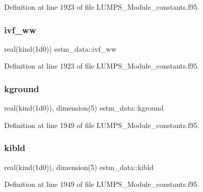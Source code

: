 Definition at line 1923 of file L\+U\+M\+P\+S\+\_\+\+Module\+\_\+constants.\+f95.

\mbox{\label{namespaceestm__data_aae1ab3ae31af3a3a39bfc76c3ba8a3f1}} 
\subsubsection{\texorpdfstring{ivf\+\_\+ww}{ivf\_ww}}
{\footnotesize\ttfamily real(kind(1d0)) estm\+\_\+data\+::ivf\+\_\+ww}



Definition at line 1923 of file L\+U\+M\+P\+S\+\_\+\+Module\+\_\+constants.\+f95.

\mbox{\label{namespaceestm__data_a4bc69fd9c3630659ed7aa78ab5218b3e}} 
\subsubsection{\texorpdfstring{kground}{kground}}
{\footnotesize\ttfamily real(kind(1d0)), dimension(5) estm\+\_\+data\+::kground}



Definition at line 1949 of file L\+U\+M\+P\+S\+\_\+\+Module\+\_\+constants.\+f95.

\mbox{\label{namespaceestm__data_ad62e9580ef44ce102500c1a5db394ca4}} 
\subsubsection{\texorpdfstring{kibld}{kibld}}
{\footnotesize\ttfamily real(kind(1d0)), dimension(5) estm\+\_\+data\+::kibld}



Definition at line 1949 of file L\+U\+M\+P\+S\+\_\+\+Module\+\_\+constants.\+f95.

\mbox{\label{namespaceestm__data_a77620242922d0fa7a2312ae03e464ce8}} 
